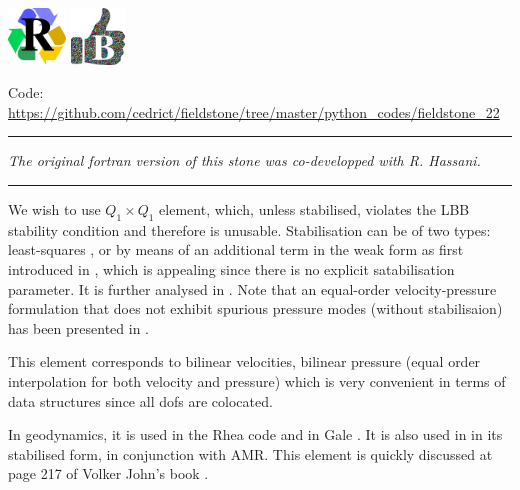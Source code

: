 
\includegraphics[height=1.5cm]{images/pictograms/replication}
\includegraphics[height=1.5cm]{images/pictograms/benchmark}



\begin{center}
\inpython
{\small Code: \url{https://github.com/cedrict/fieldstone/tree/master/python_codes/fieldstone_22}}
\end{center}

\par\noindent\rule{\textwidth}{0.4pt}

{\sl The original fortran version of this stone was co-developped with R. Hassani.}

\par\noindent\rule{\textwidth}{0.4pt}

We wish to use $Q_1 \times Q_1$ element, which, unless stabilised,
violates  the LBB stability condition and therefore is unusable. 
Stabilisation can be of two types: least-squares \cite{dohu03,temr92,kibr12,gubl07},
or by means of an additional term in the weak form as first introduced in \cite{dobo04,bodg06}, 
which is appealing since there is no explicit satabilisation parameter.
It is further analysed in \cite{nosi01,lihc09,hufb86,shry78,grcc95}.
Note that an equal-order velocity-pressure formulation that does not exhibit spurious
pressure modes (without stabilisaion) has been presented in \cite{risc86}.

This element corresponds to bilinear velocities, bilinear pressure 
(equal order interpolation for both velocity and pressure) which is 
very convenient in terms of data structures since all dofs are colocated.

In geodynamics, it is used in the Rhea code \cite{stgb10,busa13} and in Gale \cite{arbi13}.
It is also used in \cite{lezh11} in its stabilised form, in conjunction with AMR. 
This element is quickly discussed at page 217 of Volker John's book \cite{john16}.

